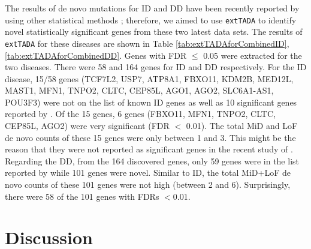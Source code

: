 \documentclass[]{article}
\begin{document}
The results of de novo mutations for ID and DD have been
recently reported by using other statistical methods \citep{mcrae2016prevalence, lelieveld2016meta}; therefore, we
aimed to use \texttt{extTADA} to identify novel statistically significant genes from these two
latest data sets. The results of \texttt{extTADA} for these diseases are shown
in Table \ref{tab:extTADAforCombinedID},
\ref{tab:extTADAforCombinedDD}. Genes with FDR $\le$ 0.05 were extracted for the two
diseases. There were 58 and 164 genes for ID and DD respectively. For
 the ID disease, 15/58 genes
 (TCF7L2, USP7, ATP8A1, FBXO11, KDM2B, MED12L, MAST1, MFN1, TNPO2,
 CLTC, CEP85L, AGO1, AGO2, SLC6A1-AS1, POU3F3)
 were not on the list of known ID
 genes as well as 10 significant genes reported by \cite{lelieveld2016meta}. Of the 15
 genes, 6 genes (FBXO11, MFN1,  TNPO2, CLTC,  CEP85L, AGO2) were very significant (FDR $<$ 0.01).
The total MiD and LoF de novo counts of these 15 genes were
 only between 1 and 3. This might be the reason that they were not
 reported as significant genes in the recent study of \cite{lelieveld2016meta}.
Regarding the DD, from the 164 discovered genes, only 59 genes were in
the list reported by \cite{mcrae2016prevalence} while 101 genes were
novel. Similar to ID, the total MiD+LoF de novo counts of these 101 genes were
not high (between 2 and 6). Surprisingly, there were 58 of the 101 genes with
FDRs $<0.01$.


\section{Discussion}
\end{document}
